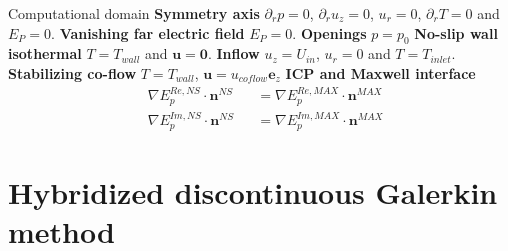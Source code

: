 \documentclass[24pt,t,table, aspectratio=169]{beamer}
\newcommand{\vecu}{\mathbf{u}}
\newcommand{\vecn}{\mathbf{n}}
\begin{document}
\begin{frame}{Computational domain}
{
\textbf{Symmetry axis} $\partial_r p = 0$, $\partial_r u_z = 0$, $u_r = 0$, $\partial_r T = 0$ and $E_P = 0$.
}
{
\textbf{Vanishing far electric field} $E_P = 0$.
}
{
\textbf{Openings} $p = p_0$
}
{	
\textbf{No-slip wall isothermal} $T = T_{wall}$ and $\vecu = \mathbf{0}$.
}
{
\textbf{Inflow} $u_z = U_{in}$, $u_r = 0$ and $T = T_{inlet}$.
}
{
\textbf{Stabilizing co-flow} $T = T_{wall}$, $\vecu = u_{coflow} \mathbf{e}_z$
}
{
\textbf{ICP and Maxwell interface}
\begin{equation*}
\begin{aligned}
&\nabla E_p^{Re, NS} \cdot \vecn^{NS} &&= \nabla E_p^{Re, MAX} \cdot \vecn^{MAX}\\
&\nabla E_p^{Im, NS} \cdot \vecn^{NS} &&= \nabla E_p^{Im, MAX} \cdot \vecn^{MAX}
\end{aligned}
\end{equation*}
}
\end{frame}

\section{Hybridized discontinuous Galerkin method}
\end{document}
